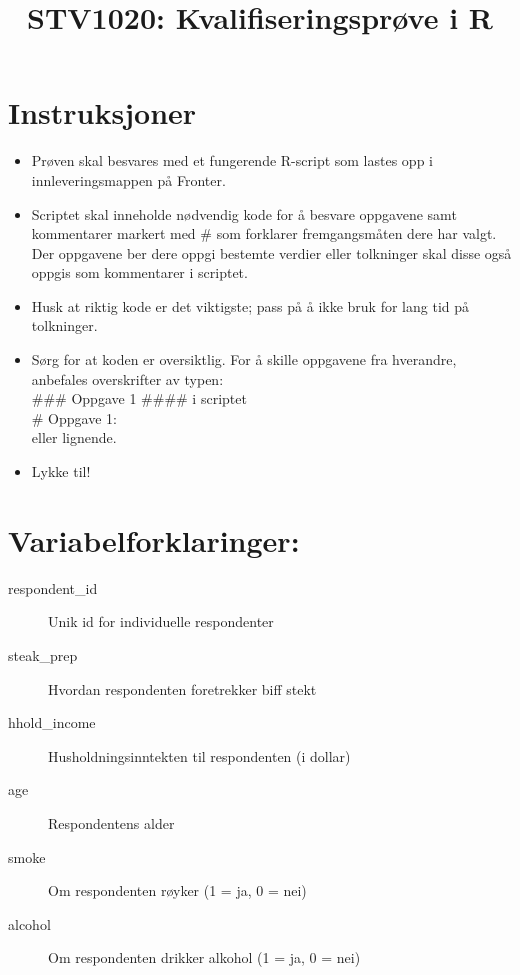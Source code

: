 \documentclass[12pt]{article}
\title{STV1020: Kvalifiseringsprøve i R}
\author{}
\date{}
\begin{document}
\section*{Instruksjoner}
\begin{itemize}
\item Prøven skal besvares med et fungerende R-script som lastes opp i innleveringsmappen
p{\aa} Fronter.

\item Scriptet skal inneholde nødvendig kode for å besvare oppgavene samt kommentarer markert med \# som forklarer fremgangsmåten dere har valgt. Der oppgavene ber dere oppgi bestemte verdier eller tolkninger skal disse også oppgis som kommentarer i scriptet.

\item Husk at riktig kode er det viktigste; pass på å ikke bruk for lang tid på tolkninger.

\item Sørg for at koden er oversiktlig. For å skille oppgavene fra hverandre, anbefales overskrifter av typen: \\
\#\#\# Oppgave 1 \#\#\#\# i scriptet \\
\# Oppgave 1: \\ eller lignende.

\item Lykke til!
\end{itemize}

\vfill

\section*{Variabelforklaringer:}
\begin{description}
  \item[respondent{\_}id] Unik id for individuelle respondenter
  \item[steak{\_}prep] Hvordan respondenten foretrekker biff stekt
  \item[hhold\_income] Husholdningsinntekten til respondenten (i dollar)
  \item[age] Respondentens alder
  \item[smoke] Om respondenten r{\o}yker (1 = ja, 0 = nei)
  \item[alcohol] Om respondenten drikker alkohol (1 = ja, 0 = nei)
\end{description}

\newpage
\end{document}
